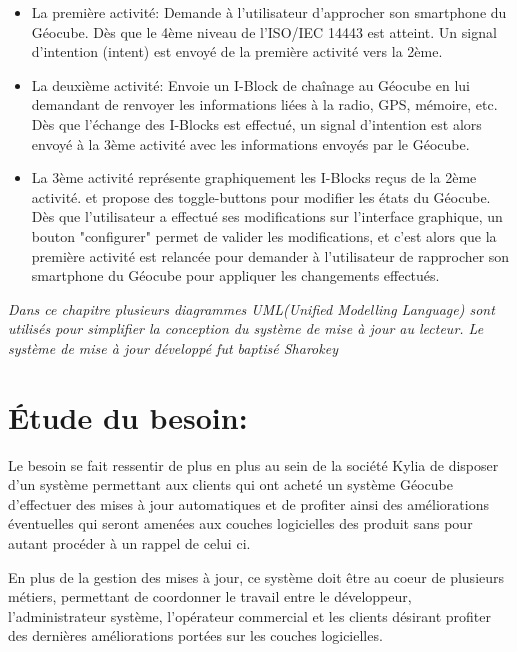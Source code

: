 \documentclass{themeensg}
\begin{document}
\begin{itemize}
\item La première activité: Demande à l'utilisateur d'approcher son smartphone du Géocube. Dès que le 4ème niveau de l'ISO/IEC 14443 est atteint. Un signal d'intention (intent) est envoyé de la première activité vers la 2ème.
\item La deuxième activité: Envoie un I-Block de chaînage au Géocube en lui demandant de renvoyer les informations liées à la radio, GPS, mémoire, etc. Dès que l'échange des I-Blocks est effectué, un signal d'intention est alors envoyé à la 3ème activité avec les informations envoyés par le Géocube.
\item La 3ème activité représente graphiquement les I-Blocks reçus de la 2ème activité. et propose des toggle-buttons pour modifier les états du Géocube. Dès que l'utilisateur a effectué ses modifications sur l'interface graphique, un bouton "configurer" permet de valider les modifications, et c'est alors que la première activité est relancée pour demander à l'utilisateur de rapprocher son smartphone du Géocube pour appliquer les changements effectués.
\end{itemize}
\textit{ Dans ce chapitre plusieurs diagrammes UML(Unified Modelling Language) sont utilisés pour simplifier la conception du système de mise à jour au lecteur. Le système de mise à jour développé fut baptisé Sharokey}
\section{Étude du besoin:}
Le besoin se fait ressentir de plus en plus au sein de la société Kylia de disposer d'un système permettant aux clients qui ont acheté un système Géocube  d'effectuer des mises à jour automatiques et de profiter ainsi des améliorations éventuelles qui seront amenées aux couches logicielles des produit sans pour autant procéder à un rappel de celui ci.

En plus de la gestion des mises à jour, ce système doit être au coeur de plusieurs métiers, permettant de coordonner le travail entre le développeur, l'administrateur système, l'opérateur commercial et les clients désirant profiter des dernières améliorations portées sur les couches logicielles.
\end{document}
